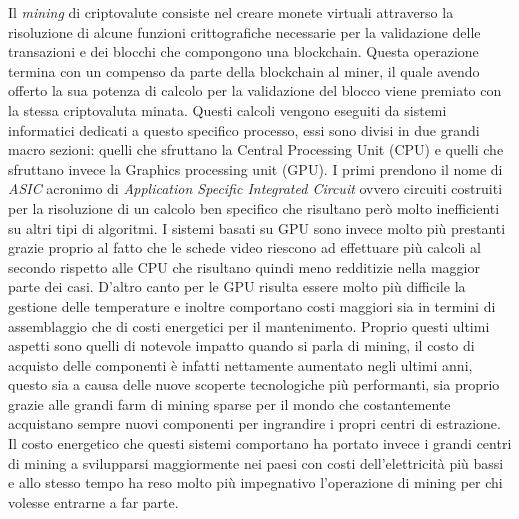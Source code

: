 \documentclass[
11pt, %
oneside, %
italian, %
onehalfspacing,%
headsepline, %
]{MastersDoctoralThesis} %
\begin{document}
Il \emph{mining} di criptovalute consiste nel creare monete virtuali attraverso la risoluzione di alcune funzioni crittografiche necessarie per la validazione delle transazioni e dei blocchi che compongono una blockchain. Questa operazione termina con un compenso da parte della blockchain al miner, il quale avendo offerto la sua potenza di calcolo per la validazione del blocco viene premiato con la stessa criptovaluta minata. Questi calcoli vengono eseguiti da sistemi informatici dedicati a questo specifico processo, essi sono divisi in due grandi macro sezioni: quelli che sfruttano la Central Processing Unit (CPU) e quelli che sfruttano invece la Graphics processing unit (GPU). I primi prendono il nome di \emph{ASIC} acronimo di \emph{Application Specific Integrated Circuit} ovvero circuiti costruiti per la risoluzione di un calcolo ben specifico che risultano però molto inefficienti su altri tipi di algoritmi. I sistemi basati su GPU sono invece molto più prestanti grazie proprio al fatto che le schede video riescono ad effettuare più calcoli al secondo rispetto alle CPU che risultano quindi meno redditizie nella maggior parte dei casi. D'altro canto per le GPU risulta essere molto più difficile la gestione delle temperature e inoltre comportano costi maggiori sia in termini di assemblaggio che di costi energetici per il mantenimento. Proprio questi ultimi aspetti sono quelli di notevole impatto quando si parla di mining, il costo di acquisto delle componenti è infatti nettamente aumentato negli ultimi anni, questo sia a causa delle nuove scoperte tecnologiche più performanti, sia proprio grazie alle grandi farm di mining sparse per il mondo che costantemente acquistano sempre nuovi componenti per ingrandire i propri centri di estrazione. Il costo energetico che questi sistemi comportano ha portato invece i grandi centri di mining a svilupparsi maggiormente nei paesi con costi dell'elettricità più bassi e allo stesso tempo ha reso molto più impegnativo l'operazione di mining per chi volesse entrarne a far parte.\\
\end{document}
